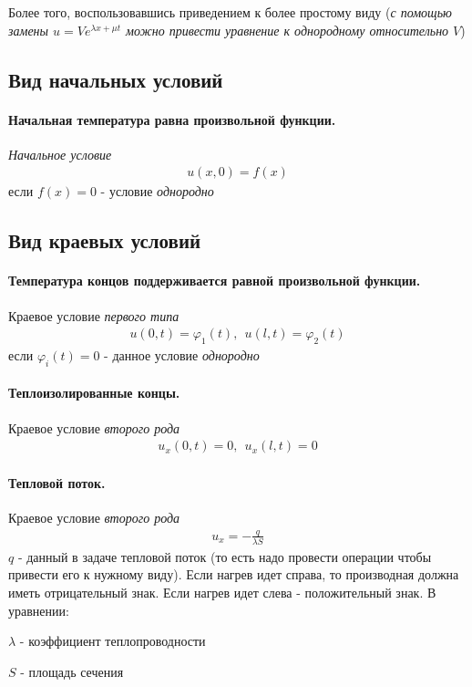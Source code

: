 \documentclass{article}[12pt]
\begin{document}
\par Более того, воспользовавшись приведением к более простому виду
(\textit{с помощью замены $u=Ve^{\lambda x+\mu t}$ можно привести
уравнение к однородному относительно $V$})

\subsection{Вид начальных условий}
\paragraph{Начальная температура равна произвольной функции.} \textit{Начальное
условие} 
\begin{eqnarray*}
    u(x,0)=f(x)
\end{eqnarray*}
если $f(x)=0$ - условие \textit{однородно}


\subsection{Вид краевых условий}

\paragraph{Температура концов поддерживается равной произвольной
функции.}
Краевое условие \textit{первого типа}
\begin{eqnarray*}
    u(0,t)=\varphi_{1}(t),\ \ u(l,t)=\varphi_{2}(t)
\end{eqnarray*}
если $\varphi_{i}(t)=0$ - данное условие \textit{однородно}

\paragraph{Теплоизолированные концы.} Краевое условие \textit{второго рода}
\begin{eqnarray*}
    u_{x}(0,t)=0,\ \ u_{x}(l,t)=0
\end{eqnarray*}

\paragraph{Тепловой поток.} Краевое условие \textit{второго рода}
\begin{eqnarray*}
    u_{x}=-\frac{q}{\lambda S}
\end{eqnarray*}
$q$ - данный в задаче тепловой поток (то есть надо провести операции
чтобы привести его к нужному виду). Если нагрев идет справа, то
производная должна иметь отрицательный знак. Если нагрев идет слева -
положительный знак. В уравнении:
\begin{description}[noitemsep,topsep=0pt]
    \item $\lambda$ - коэффициент теплопроводности
    \item $S$ - площадь сечения
\end{description}
\end{document}
